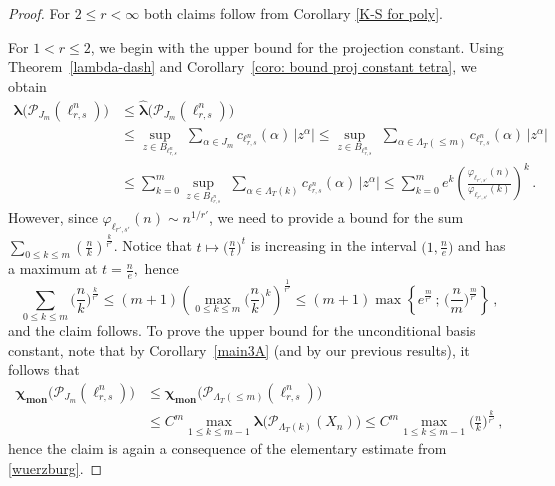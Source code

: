 \documentclass[12pt]{amsart}
\numberwithin{subsection}{section}
\theoremstyle{definition}
\theoremstyle{remark}
\newcommand{\dis}{\displaystyle}
\DeclareMathOperator{\mon}{mon}
\newcommand{\chimon}{\chi_{\mon}}
\begin{document}
\begin{proof}
For $2 \leq r < \infty$ both claims  follow from Corollary \ref{K-S for poly}.

For $1 < r \leq 2$, we begin with the upper bound for the projection constant. Using
Theorem~\ref{lambda-dash} and  Corollary~\ref{coro: bound proj constant tetra}, we obtain
\begin{align*}
\boldsymbol{\lambda}\big(\mathcal{P}_{J_m}(\ell_{r,s}^n)\big)
&
\leq
\widehat{\boldsymbol{\lambda}}\big(\mathcal{P}_{J_m}(\ell_{r,s}^n)\big)
\\
&
\le
\sup_{z\in B_{\ell_{r,s}^n}}\,\,\sum_{\alpha \in J_m} c_{\ell_{r,s}^n}(\alpha) \,|z^\alpha |
\le \sup_{z\in B_{\ell_{r,s}^n}}\,\,\sum_{\alpha \in \Lambda_T(\le m)} c_{\ell_{r,s}^n}(\alpha) \,|z^\alpha |
\\
&
\le \sum_{k=0}^{m} \sup_{z\in B_{\ell_{r,s}^n}}\,\,\sum_{\alpha \in \Lambda_T( k)} c_{\ell_{r,s}^n}(\alpha) \,|z^\alpha|
\le \sum_{k=0}^{m} e^k \left(  \frac{\varphi_{\ell_{r',s'}}(n)}{\varphi_{\ell_{r',s'}}(k)}\right)^{k}\,.
\end{align*}
However, since $\varphi_{\ell_{r',s'}}(n) \sim n^{1/r'}$, we need to provide a bound for the sum $\dis\sum_{0 \leq k \leq m} \left( \frac{n}{k} \right)^{\frac{k}{r'}}$.
Notice that $t\mapsto\big( \frac{n}{t}\big)^t$ is increasing in the interval $\big(1,\frac{n}{e}\big)$ and has a maximum at
$t=\frac{n}{e},$ hence
\begin{equation}\label{wuerzburg}
\sum_{0\leq k \leq m} \Big( \frac{n}{k}\Big)^{\frac{k}{r'}} \leq (m+1)\left(\max_{0\leq k \leq m}  \Big(\frac{n}{k}\Big)^k\right)^{\frac{1}{r'}}
\leq   (m+1)\max\left\{e^{\frac{m}{r'}} \,;\,\Big( \frac{n}{m}\Big)^{\frac{m}{r'}}\right\}\,,
\end{equation}
and the claim follows. To prove the upper bound for the unconditional basis constant, note that by Corollary~\ref{main3A} (and by our previous
results), it follows that
\begin{align*}
\boldsymbol{\chimon}\big(\mathcal{P}_{J_m}(\ell_{r,s}^n)\big)
& \leq \boldsymbol{\chimon}\big(\mathcal{P}_{\Lambda_T(\leq m)}(\ell_{r,s}^n)\big) \\
& \le C^m  \max_{1 \leq  k \leq m-1} \boldsymbol{\lambda}\big( \mathcal{P}_{\Lambda_T(k)}(X_n)\big)
\le C^m \max_{1 \leq  k \leq m-1} \Big( \frac{n}{k}\Big)^{\frac{k}{r'}}\,,
\end{align*}
hence the claim is again a consequence of the elementary estimate from \eqref{wuerzburg}.
\end{proof}
\end{document}
